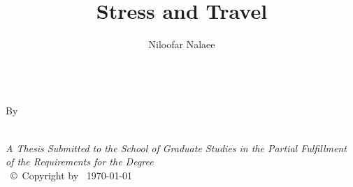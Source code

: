 \documentclass[
11pt, %
oneside, %
english, %
singlespacing, %
]{macthesis} %
\title{Stress and Travel}
\author{Niloofar Nalaee}
\date{}
\begin{document}
\sloppy

\frontmatter %

\pagestyle{plain} %

\vspace{6cm}
\begin{center}
\ttitle
\end{center}
\clearpage

\begin{center}

\vfill
\textsc{\Large \ttitle}\\[1 cm]

By  \\[1 cm]
{\authorname\, \bdeg }


 \vfill
{\large \textit{A Thesis Submitted to the School of Graduate Studies in the Partial Fulfillment of the Requirements for the Degree \degreename}}\\

\vfill
{\large \univname\, \copyright\, Copyright by \authorname\, \today}\\[4cm] %

\end{center}
\clearpage




\newpage
{} %
\setcounter{page}{2} %
\end{document}
